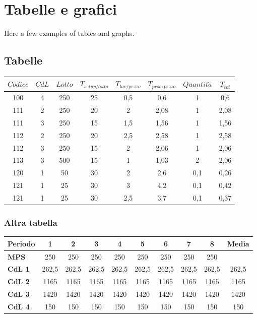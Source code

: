 \documentclass{FR16}
\begin{document}
\section{Tabelle e grafici}
Here a few examples of tables and graphs.
\subsection{Tabelle}
\begin{center}
\begin{tabular}{c c c c c c c c}
\arrayrulecolor{Azzurro}
\hline
{\bfseries $Codice$} & {\bfseries $CdL$} & {\bfseries $Lotto$} & {\bfseries $T_{setup/lotto}$} & {\bfseries $T_{lav/pezzo}$} & {\bfseries $T_{proc/pezzo}$} & {\bfseries$Quantit\grave{a}$} & {\bfseries $T_{tot}$}\\
\hline
100 & 4 & 250 & 25 & 0,5 & 0,6 & 1 & 0,6\\
111 & 2 & 250 & 20 & 2 & 2,08 & 1 & 2,08 \\
111 & 3 & 250 & 15 & 1,5 & 1,56 & 1 & 1,56 \\
112 & 2 & 250 & 20 & 2,5 & 2,58 & 1 & 2,58 \\
112 & 3 & 250 & 15 & 2 & 2,06 & 1 & 2,06\\
113 & 3 & 500 & 15 & 1 & 1,03 & 2 & 2,06\\
120 & 1 & 50 & 30 & 2 & 2,6 & 0,1 & 0,26\\
121 & 1 & 25 & 30 & 3 & 4,2 & 0,1 & 0,42 \\
121 & 1 & 25 & 30 & 2,5 & 3,7 & 0,1 & 0,37 \\
\hline
\end{tabular}
\end{center}

\subsubsection{Altra tabella}
\begin{center}
\begin{tabular}{l c c c c c c c c c}
\arrayrulecolor{Azzurro}
\hline
{\bfseries Periodo} & 1 & 2 & 3 & 4 & 5 & 6 & 7 & 8 & Media\\
\hline
{\bfseries MPS} & 250 & 250 & 250 & 250 & 250 & 250 & 250 & 250 & \\
{\bfseries CdL 1} & 262,5 & 262,5 & 262,5 & 262,5 & 262,5 & 262,5 & 262,5 & 262,5 & 262,5\\
{\bfseries CdL 2} & 1165 & 1165 & 1165 & 1165 & 1165 & 1165 & 1165 & 1165 & 1165\\
{\bfseries CdL 3} & 1420 & 1420 & 1420 & 1420 & 1420 & 1420 & 1420 & 1420 & 1420\\
{\bfseries CdL 4} & 150 & 150 & 150 & 150 & 150 & 150 & 150 & 150 & 150\\
\hline
\end{tabular}
\end{center}
\end{document}
